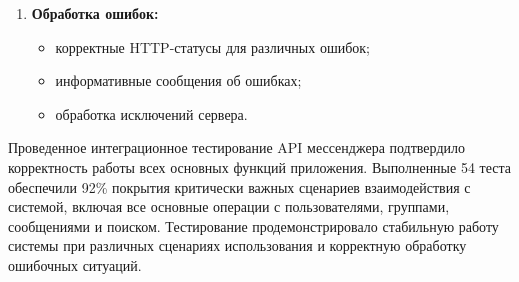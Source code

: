 \begin{enumerate}
	\item \textbf{Обработка ошибок:}
	\begin{itemize}
		\item корректные HTTP-статусы для различных ошибок;
		\item информативные сообщения об ошибках;
		\item обработка исключений сервера.
	\end{itemize}
\end{enumerate}

Проведенное интеграционное тестирование API мессенджера подтвердило корректность работы всех основных функций приложения. Выполненные 54 теста обеспечили 92\% покрытия критически важных сценариев взаимодействия с системой, включая все основные операции с пользователями, группами, сообщениями и поиском. Тестирование продемонстрировало стабильную работу системы при различных сценариях использования и корректную обработку ошибочных ситуаций.